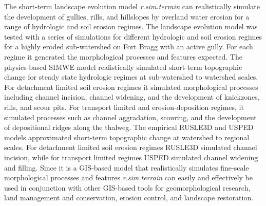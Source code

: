 \documentclass[esurf, manuscript]{copernicus}
\begin{document}
\conclusions

The short-term landscape evolution model 
\emph{r.sim.terrain} 
can realistically simulate the development of 
gullies, rills, and hillslopes by overland water erosion
for a range of hydrologic and soil erosion regimes.
%
The landscape evolution model was tested
with a series of simulations for different 
hydrologic and soil erosion regimes
for a highly eroded sub-watershed on Fort Bragg
with an active gully.
For each regime it generated the 
morphological processes and features expected.
%
The physics-based SIMWE model 
realistically simulated short-term topographic change
for steady state hydrologic regimes
at sub-watershed to watershed scales. 
For detachment limited soil erosion regimes
it simulated morphological processes including
channel incision, channel widening, and 
the development of knickzones, rills, and scour pits.
For transport limited and erosion-deposition regimes,
it simulated processes such as channel aggradation,
scouring, and the development of
depositional ridges along the thalweg.
The empirical RUSLE3D and USPED models
approximated short-term topographic change
at watershed to regional scales. 
For detachment limited soil erosion regimes 
RUSLE3D simulated channel incision,
while for transport limited regimes
USPED simulated channel widening and filling. 
Since it is a GIS-based model 
that realistically simulates 
fine-scale morphological processes and features
\emph{r.sim.terrain} can easily and effectively be used 
in conjunction with other GIS-based tools
for geomorphological research,
land management and conservation,
erosion control, and landscape restoration. 


\end{document}
